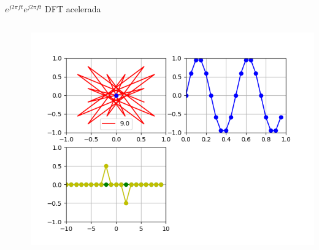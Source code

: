 \begin{frame}{$e^{j2\pi ft}$}{$e^{j2\pi ft}$ DFT acelerada}
   \handsonicon
   \begin{columns}[c]
      \hspace{2pt}
      \begin{column}{.3\textwidth}
         
      \end{column}
      \hspace{2pt}
      \vrule
      \hspace{2pt}
      \begin{column}{.3\textwidth}
         
      \end{column}
      \hspace{2pt}
      \vrule
      \hspace{2pt}
      \begin{column}{.4\textwidth}
         \centering\includegraphics[width=1.0\textwidth]{3_clase/euler5}
      \end{column}
      \hspace{2pt}
   \end{columns}
   \vfill
\end{frame}
